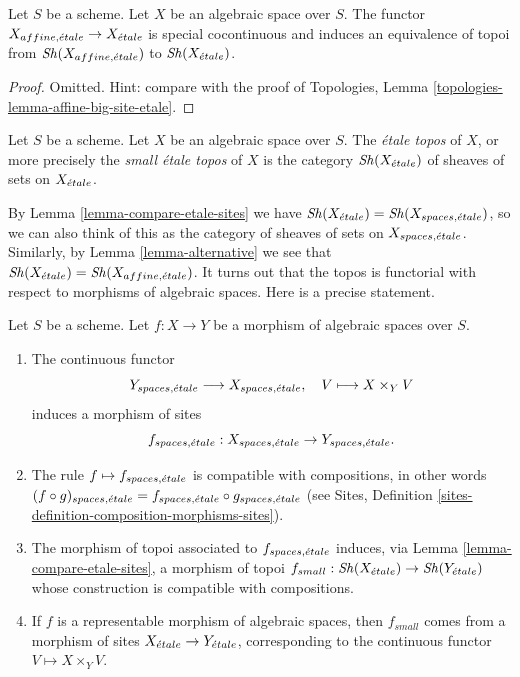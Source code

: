 \begin{lemma}
\label{lemma-alternative}
Let $S$ be a scheme. Let $X$ be an algebraic space over $S$.
The functor $X_{affine, {\acute{e}tale}} \to X_{\acute{e}tale}$
is special cocontinuous and induces an equivalence of topoi from
$\mathop{\mathit{Sh}}\nolimits(X_{affine, {\acute{e}tale}})$ to $\mathop{\mathit{Sh}}\nolimits(X_{\acute{e}tale})$.
\end{lemma}

\begin{proof}
Omitted. Hint: compare with the proof of
Topologies, Lemma \ref{topologies-lemma-affine-big-site-etale}.
\end{proof}

\begin{definition}
\label{definition-etale-topos}
Let $S$ be a scheme. Let $X$ be an algebraic space over $S$.
The {\it \'etale topos} of $X$, or more precisely the
{\it small \'etale topos} of $X$ is the category
$\mathop{\mathit{Sh}}\nolimits(X_{\acute{e}tale})$
of sheaves of sets on $X_{\acute{e}tale}$.
\end{definition}

\noindent
By
Lemma \ref{lemma-compare-etale-sites}
we have
$\mathop{\mathit{Sh}}\nolimits(X_{\acute{e}tale}) = \mathop{\mathit{Sh}}\nolimits(X_{spaces, {\acute{e}tale}})$,
so we can also think of this as the category of sheaves of sets on
$X_{spaces, {\acute{e}tale}}$. Similarly, by
Lemma \ref{lemma-alternative}
we see that
$\mathop{\mathit{Sh}}\nolimits(X_{\acute{e}tale}) = \mathop{\mathit{Sh}}\nolimits(X_{affine, {\acute{e}tale}})$.
It turns out that the topos is functorial with respect to morphisms
of algebraic spaces. Here is a precise statement.

\begin{lemma}
\label{lemma-functoriality-etale-site}
Let $S$ be a scheme.
Let $f : X \to Y$ be a morphism of algebraic spaces over $S$.
\begin{enumerate}
\item The continuous functor
$$
Y_{spaces, {\acute{e}tale}} \longrightarrow X_{spaces, {\acute{e}tale}}, \quad
V \longmapsto X \times_Y V
$$
induces a morphism of sites
$$
f_{spaces, {\acute{e}tale}} :
X_{spaces, {\acute{e}tale}}
\to
Y_{spaces, {\acute{e}tale}}.
$$
\item The rule $f \mapsto f_{spaces, {\acute{e}tale}}$ is compatible with
compositions, in other words $(f \circ g)_{spaces, {\acute{e}tale}}
= f_{spaces, {\acute{e}tale}} \circ g_{spaces, {\acute{e}tale}}$ (see
Sites, Definition \ref{sites-definition-composition-morphisms-sites}).
\item The morphism of topoi associated to $f_{spaces, {\acute{e}tale}}$
induces, via Lemma \ref{lemma-compare-etale-sites}, a morphism of topoi
$f_{small} : \mathop{\mathit{Sh}}\nolimits(X_{\acute{e}tale}) \to \mathop{\mathit{Sh}}\nolimits(Y_{\acute{e}tale})$
whose construction is compatible with compositions.
\item If $f$ is a representable morphism of algebraic spaces,
then $f_{small}$ comes from a morphism of sites
$X_{\acute{e}tale} \to Y_{\acute{e}tale}$,
corresponding to the continuous functor $V \mapsto X \times_Y V$.
\end{enumerate}
\end{lemma}


